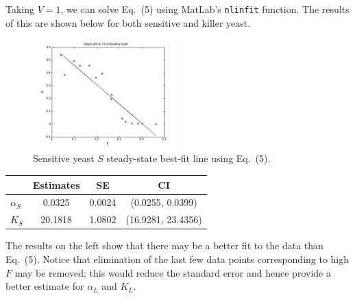 Taking $V = 1$, we can solve Eq.\ (5) using MatLab's \texttt{nlinfit} function.  The results of this are shown below for both sensitive and killer yeast.
\begin{multicols}{2}
\begin{figure}[H]
  \centering
    \includegraphics[width=0.5\textwidth]{images/sensitiveFit.jpg}
  \caption{\footnotesize Sensitive yeast $S$ steady-state best-fit line using Eq.\ (5).}
\end{figure}
\begin{center}
\begin{tabular}{l | c c c}
  & Estimates & SE & CI \\ 
  \hline
  $\alpha_S$ & 0.0325  & 0.0024 & (0.0255,  0.0399) \\
  $K_S$      & 20.1818 & 1.0802 & (16.9281, 23.4356) \\
\end{tabular}
\end{center}
The results on the left show that there may be a better fit to the data than Eq.\ (5).  Notice that elimination of the last few data points corresponding to high $F$ may be removed; this would reduce the standard error and hence provide a better estimate for $\alpha_L$ and $K_L$.
\end{multicols}

